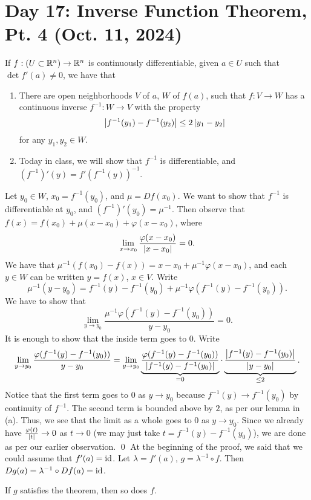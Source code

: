 \section{Day 17: Inverse Function Theorem, Pt. 4 (Oct. 11, 2024)}
If $f : (U \subset \mathbb R^n) \to \mathbb R^n$ is continuously differentiable, given $a \in U$ such that $\det f'(a) \neq 0$, we have that
\begin{enumerate}[label=(\alph*)]
    \item There are open neighborhoods $V$ of $a$, $W$ of $f(a)$, such that $f : V \to W$ has a continuous inverse $f^{-1} : W \to V$ with the property
    \[ \left\lvert f^{-1}(y_1) - f^{-1}(y_2) \right\rvert \leq 2\left\lvert y_1 - y_2 \right\rvert \]
    for any $y_1, y_2 \in W$.
    \item Today in class, we will show that $f^{-1}$ is differentiable, and $(f^{-1})'(y) = f'(f^{-1}(y))^{-1}$.
\end{enumerate}
\noindent Let $y_0 \in W$, $x_0 = f^{-1}(y_0)$, and $\mu = D f(x_0)$. We want to show that $f^{-1}$ is differentiable at $y_0$, and $(f^{-1})'(y_0) = \mu^{-1}$. Then observe that $f(x) = f(x_0) + \mu(x - x_0) + \varphi(x - x_0)$, where
\[ \lim_{x \to x_0} \frac{\varphi(x - x_0)}{\left\lvert x - x_0 \right\rvert} = 0. \]
We have that $\mu^{-1}(f(x_0) - f(x)) = x - x_0 + \mu^{-1} \varphi(x - x_0)$, and each $y \in W$ can be written $y = f(x)$, $x \in V$. Write
\[ \mu^{-1}(y - y_0) = f^{-1}(y) - f^{-1}(y_0) + \mu^{-1} \varphi(f^{-1}(y) - f^{-1}(y_0)). \]
We have to show that
\[ \lim_{y \to y_0} \frac{\mu^{-1} \varphi(f^{-1}(y) - f^{-1}(y_0))}{y - y_0} = 0. \]
It is enough to show that the inside term goes to $0$. Write
\[ \lim_{y \to y_0} \frac{\varphi(f^{-1}(y) - f^{-1}(y_0))}{y - y_0} = \lim_{y \to y_0} \underbrace{\frac{\varphi(f^{-1}(y) - f^{-1}(y_0))}{\left\lvert f^{-1}(y) - f^{-1}(y_0) \right\rvert}}_{= 0} \cdot \underbrace{\frac{\left\lvert f^{-1}(y) - f^{-1}(y_0) \right\rvert}{\left\lvert y - y_0 \right\rvert}}_{\leq 2}. \]
Notice that the first term goes to $0$ as $y \to y_0$ because $f^{-1}(y) \to f^{-1}(y_0)$ by continuity of $f^{-1}$. The second term is bounded above by $2$, as per our lemma in (a). Thus, we see that the limit as a whole goes to $0$ as $y \to y_0$. Since we already have $\frac{\varphi(t)}{\left\lvert t \right\rvert} \to 0$ as $t \to 0$ (we may just take $t = f^{-1}(y) - f^{-1}(y_0)$), we are done as per our earlier observation. \qed
\medskip\newline
At the beginning of the proof, we said that we could assume that $f'(a) = \mathrm{id}$. Let $\lambda = f'(a)$, $g = \lambda^{-1} \circ f$. Then $D g(a) = \lambda^{-1} \circ D f(a) = \mathrm{id}$. 
\begin{simpleclaim}
    If $g$ satisfies the theorem, then so does $f$.
\end{simpleclaim}
